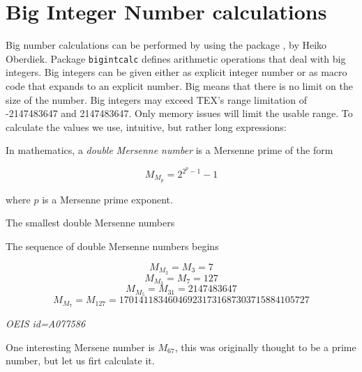 \section*{Big Integer Number calculations}

\begin{multicols}{2}
Big number calculations can be performed by using the package , by Heiko Oberdiek. 
Package \texttt{bigintcalc} defines arithmetic operations that deal with big integers. Big
integers can be given either as explicit integer number or as macro code that
expands to an explicit number. Big means that there is no limit on the size of
the number. Big integers may exceed TEX's range limitation of -2147483647 and
2147483647. Only memory issues will limit the usable range. To calculate the values we use, intuitive, but rather long expressions:

\begin{teXXX}
\end{teXXX}

\end{multicols}

In mathematics, a \textit{double Mersenne number} is a Mersenne prime of the form

\[M_{M_p} = 2^{2^p-1}-1\]


where $p$ is a Mersenne prime exponent.

The smallest double Mersenne numbers 

The sequence of double Mersenne numbers begins %

\[M_{M_2} = M_3 = 7 \]
\[M_{M_3} = M_7 = 127 \]
\[M_{M_5} = M_{31} = 2147483647 \]
\[M_{M_7} = M_{127} = 170141183460469231731687303715884105727 \]

\textit{OEIS id=A077586}

\begin{multicols}{2}
One interesting Mersene number is $M_{67}$, this was originally thought to be a prime number,
but let us firt calculate it.
\end{multicols}
\begin{teXXX}
\def\Mersenne#1{%
  \gdef\exponent##1{\bigintcalcPow{2}{##1}}%
  \bigintcalcSub{\exponent{#1}}{1}
}
\end{teXXX}
\def\Mersenne#1{%
  \gdef\exponent##1{\bigintcalcPow{2}{##1}}%
  \bigintcalcSub{\exponent{#1}}{1}
}


